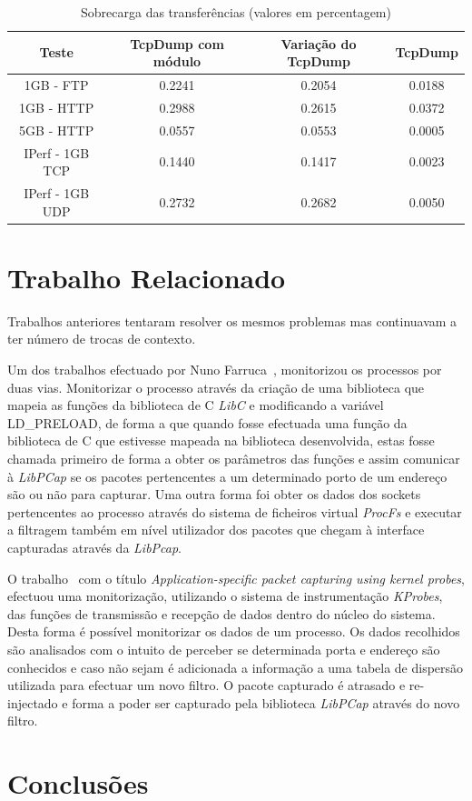 \documentclass[a4paper]{llncs}
\begin{document}
\begin{table}
\begin{center}
\caption{Sobrecarga das transferências (valores em percentagem)}
\begin{tabular}{ | c | c | c | c | }
\hline
Teste & TcpDump com módulo & Variação do TcpDump & \hspace {0.3cm} TcpDump \hspace {0.3cm}\\

\hline
1GB - FTP  & 0.2241 & 0.2054 & 0.0188 \\
1GB - HTTP &  0.2988 & 0.2615 & 0.0372 \\
5GB - HTTP &  0.0557 & 0.0553 & 0.0005 \\
IPerf - 1GB TCP &  0.1440 & 0.1417 & 0.0023 \\
IPerf - 1GB UDP & 0.2732 & 0.2682 & 0.0050 \\
\hline
\end{tabular}
\end{center}
\end{table}

\section{Trabalho Relacionado}
\label{sec:related_work}
Trabalhos anteriores tentaram resolver os mesmos problemas mas continuavam a ter número de trocas de contexto.

Um dos trabalhos efectuado por Nuno Farruca~\cite{Farruca:2009,duarte10}, monitorizou os processos por duas vias. Monitorizar o processo através da criação de uma biblioteca que mapeia as funções da biblioteca de C \textit{LibC} e modificando a variável LD\_PRELOAD, de forma a que quando fosse efectuada uma função da biblioteca de C que estivesse mapeada na biblioteca desenvolvida, estas fosse chamada primeiro de forma a obter os parâmetros das funções e assim comunicar à \textit{LibPCap} se os pacotes pertencentes a um determinado porto de um endereço são ou não para capturar. Uma outra forma foi obter os dados dos sockets pertencentes ao processo através do sistema de ficheiros virtual \textit{ProcFs} e executar a filtragem também em nível utilizador dos pacotes que chegam à interface capturadas através da \textit{LibPcap}.

O trabalho~\cite{1688981} com o título \textit{Application-specific packet capturing using kernel probes}, efectuou uma monitorização, utilizando o sistema de instrumentação \textit{KProbes}, das funções de transmissão e recepção de dados dentro do núcleo do sistema. Desta forma é possível monitorizar os dados de um processo. Os dados recolhidos são analisados com o intuito de perceber se determinada porta e endereço são conhecidos e caso não sejam é adicionada a informação a uma tabela de dispersão utilizada para efectuar um novo filtro. O pacote capturado  é atrasado e re-injectado e forma a poder ser capturado pela biblioteca \textit{LibPCap} através do novo filtro.

\section{Conclusões}
\label{sec:conclusions}




\end{document}
